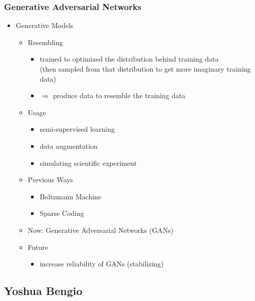 \subsubsection{Generative Adversarial Networks}
\begin{itemize}
\item Generative Models
	\begin{itemize}
	\item Resembling
		\begin{itemize}
		\item trained to optimized the distribution behind training data \\ 
		(then sampled from that distribution to get more imaginary training data)
		\item $\Rightarrow$ produce data to resemble the training data
		\end{itemize}
	\item Usage
		\begin{itemize}
		\item semi-supervised learning
		\item data augmentation
		\item simulating scientific experiment
		\end{itemize}
	\item Previous Ways
		\begin{itemize}
		\item Boltzmann Machine
		\item Sparse Coding
		\end{itemize}
	\item Now: Generative Adversarial Networks (GANs)
	\item Future
		\begin{itemize}
		\item increase reliability of GANs (stabilizing)
		\end{itemize}
	\end{itemize}
\end{itemize}

\subsection{Yoshua Bengio}
